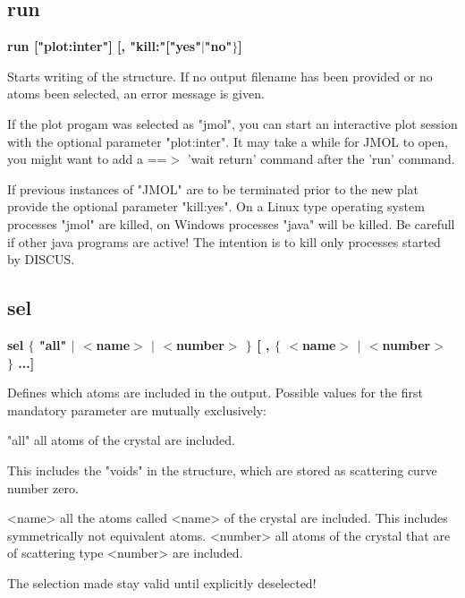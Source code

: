 \subsection*{run}
{\bf run  ["plot:inter"] [, "kill:"["yes"$| $"no"$\} $] \par }
\par
\vspace{3pt}
Starts writing of the structure. If no output filename has been provided 
or no atoms been selected, an error message is given. 
\par
If the plot progam was selected as "jmol", you can start an 
interactive plot session with the optional parameter "plot:inter". 
It may take a while for JMOL to open, you might want to add a 
==$> $ 'wait return' command after the 'run' command. 
\par
If previous instances of "JMOL" are to be terminated prior to the 
new plat provide the optional parameter "kill:yes". 
On a Linux type operating system processes "jmol" are killed, 
on Windows processes "java" will be killed. Be carefull if other 
java programs are active! The intention is to kill only processes 
started by DISCUS. 
\subsection*{sel}
{\bf sel $ \{$ "all" $| $ $ <$name$> $ $| $ $ <$number$> $ $\} $ [ , $ \{$ $ <$name$> $ $| $ $ <$number$> $ $\} $ ...] \par }
\par
\vspace{3pt}
Defines which atoms are included in the output. Possible values 
for the first mandatory parameter are mutually exclusively: 
\par
\begin{MacVerbatim}
"all"     all atoms of the crystal are included.
\end{MacVerbatim}
          This includes the "voids" in the structure, which are stored 
          as scattering curve number zero. 
\begin{MacVerbatim}
<name>    all the atoms called <name> of the crystal are included.
          This includes symmetrically not equivalent atoms.
<number>  all atoms of the crystal that are of scattering type <number>
          are included.
\end{MacVerbatim}
The selection made stay valid until explicitly deselected! 
